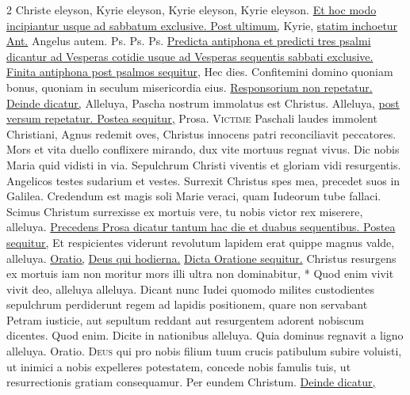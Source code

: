 \begin{multicols*}{2}
Christe eleyson, Kyrie eleyson, Kyrie eleyson, Kyrie eleyson. \ul{Et hoc modo incipiantur usque ad sabbatum exclusive. Post ultimum,} Kyrie, \ul{statim inchoetur Ant.} Angelus autem. {\color{Red} Ps.}  {\color{Red} Ps.}  {\color{Red} Ps.}  \ul{Predicta antiphona et predicti tres psalmi dicantur ad Vesperas cotidie usque ad Vesperas sequentis sabbati exclusive. Finita antiphona post psalmos sequitur,} \R Hec dies. \V Confitemini domino quoniam bonus, quoniam in seculum misericordia eius. \ul{Responsorium non repetatur. Deinde dicatur,} Alleluya, \V Pascha nostrum immolatus est Christus.
\newline Alleluya, \ul{post versum repetatur. Postea sequitur,} {\color{Red} Prosa.}
\lettrine[lines=2]{\zallmancaps \color{Red} V}{ictime} \hypertarget{victime-paschali-laudes}{\label{victime-paschali-laudes}} Paschali laudes immolent Christiani,
Agnus redemit oves, Christus innocens patri reconciliavit peccatores.
Mors et vita duello conflixere mirando, dux vite mortuus regnat vivus.
Dic nobis Maria quid vidisti in via.
Sepulchrum Christi viventis et gloriam vidi resurgentis.
Angelicos testes sudarium et vestes.
Surrexit Christus spes mea, precedet suos in Galilea.
Credendum est magis soli Marie veraci, quam Iudeorum tube fallaci.
Scimus Christum surrexisse ex mortuis vere, tu nobis victor rex miserere, alleluya.
\newline \ul{Precedens Prosa dicatur tantum hac die et duabus sequentibus. Postea sequitur,}
 Et respicientes viderunt revolutum lapidem erat quippe magnus valde, alleluya. \ul{Oratio,} \hyperlink{deus-qui-hodierna-pasche}{Deus qui hodierna.} \ul{Dicta Oratione sequitur.}
 Christus resurgens ex mortuis iam non moritur mors illi ultra non dominabitur, * Quod enim vivit vivit deo, alleluya alleluya. \V Dicant nunc Iudei quomodo milites custodientes sepulchrum perdiderunt regem ad lapidis positionem, quare non servabant Petram iusticie, aut sepultum reddant aut resurgentem adorent nobiscum dicentes. Quod enim. \V Dicite in nationibus alleluya. \R Quia dominus regnavit a ligno alleluya. {\color{Red} Oratio.}
\lettrine[lines=2]{\zallmancaps \color{Blue} D}{eus} \hypertarget{deus-qui-pro-cruce}{\label{deus-qui-pro-cruce}} qui pro nobis filium tuum crucis patibulum subire voluisti, ut inimici a nobis expelleres potestatem, concede nobis famulis tuis, ut resurrectionis gratiam consequamur. Per eundem Christum. \ul{Deinde dicatur,}

\end{multicols*}
